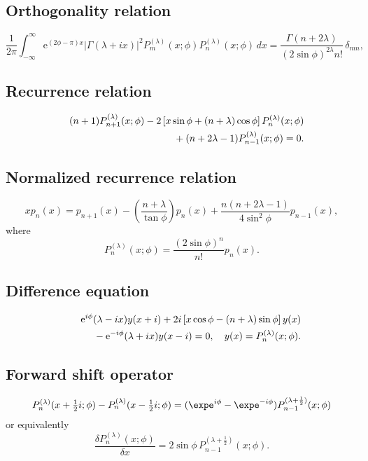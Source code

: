 \documentclass[envcountchap,graybox]{svmono}
\newcommand{\mathindent}{\hspace{7.5mm}}
\newcommand{\e}{\textrm{e}}
\renewcommand{\Gamma}{\varGamma}
\begin{document}
\subsection*{Orthogonality relation}
\begin{equation}
\label{OrtMP}
\frac{1}{2\pi}\int_{-\infty}^{\infty}
\e^{(2\phi-\pi)x}\left|\Gamma(\lambda+ix)\right|^2
P_m^{(\lambda)}(x;\phi)P_n^{(\lambda)}(x;\phi)\,dx
{}=\frac{\Gamma(n+2\lambda)}{(2\sin\phi)^{2\lambda}n!}\,\delta_{mn},
\end{equation}

\subsection*{Recurrence relation}
\begin{eqnarray}
\label{RecMP}
& &(n+1)P_{n+1}^{(\lambda)}(x;\phi)-2\left[x\sin\phi+(n+\lambda)\cos\phi\right]
P_n^{(\lambda)}(x;\phi)\nonumber\\
& &{}\mathindent{}+(n+2\lambda-1)P_{n-1}^{(\lambda)}(x;\phi)=0.
\end{eqnarray}

\subsection*{Normalized recurrence relation}
\begin{equation}
\label{NormRecMP}
xp_n(x)=p_{n+1}(x)-\left(\frac{n+\lambda}{\tan\phi}\right)p_n(x)+
\frac{n(n+2\lambda-1)}{4\sin^2\phi}p_{n-1}(x),
\end{equation}
where
$$P_n^{(\lambda)}(x;\phi)=\frac{(2\sin\phi)^n}{n!}p_n(x).$$

\subsection*{Difference equation}
\begin{eqnarray}
\label{dvMP}
& &\e^{i\phi}(\lambda-ix)y(x+i)+2i\left[x\cos\phi-(n+\lambda)\sin\phi\right]y(x)\nonumber\\
& &{}\mathindent{}-\e^{-i\phi}(\lambda+ix)y(x-i)=0,\quad y(x)=P_n^{(\lambda)}(x;\phi).
\end{eqnarray}

\subsection*{Forward shift operator}
\begin{equation}
\label{shift1MPI}
P_n^{(\lambda)}(x+\textstyle\frac{1}{2}i;\phi)-
P_n^{(\lambda)}(x-\textstyle\frac{1}{2}i;\phi)=(\expe^{i\phi}-\expe^{-i\phi})
P_{n-1}^{(\lambda+\frac{1}{2})}(x;\phi)
\end{equation}
or equivalently
\begin{equation}
\label{shift1MPII}
\frac{\delta P_n^{(\lambda)}(x;\phi)}{\delta x}
=2\sin\phi\,P_{n-1}^{(\lambda+\frac{1}{2})}(x;\phi).
\end{equation}
\end{document}
